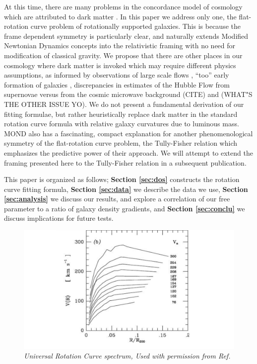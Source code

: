 \documentclass[reprint,%
 amsmath,amssymb,
 aps,
]{revtex4-1}
\begin{document}
   At this time, there are many problems in   the concordance model of   cosmology which are attributed to dark matter \cite{2010dmp..book.....S}.
   In
 this paper we address only  one,   the flat-rotation curve problem of rotationally supported galaxies. This is because  the  frame dependent symmetry   is particularly clear, and   naturally extends Modified Newtonian Dynamics concepts into the  relativistic framing with no need for  modification of classical gravity.
      We propose   that there are other places in our cosmology where dark matter is invoked which   may require different physics assumptions, as informed by observations of large scale flows \cite{Tully:2014gfa},    ``too'' early   formation of galaxies \cite{Naidu_2022}, discrepancies in estimates of the Hubble Flow from supernovae versus from the cosmic microwave background (CITE) and (WHAT"S THE OTHER ISSUE YO). 
      We do not present a fundamental derivation of our fitting formulae, but rather heuristically replace dark matter in the standard rotation curve formula with relative galaxy   curvatures due to luminous mass.  
      MOND  also   has a fascinating, compact explanation for another phenomenological symmetry of the flat-rotation curve problem, the  
   Tully-Fisher relation \cite{1977A&A....54..661T,McGaugh_2000}  which   emphasizes the predictive power of their approach.  We will attempt to extend the  framing presented here to the Tully-Fisher relation in a subsequent publication. 
   
   
      
  
 
 
 
This paper  is organized as follows;
{\bf Section \ref{sec:dos}} constructs  the rotation curve  fitting formula, 
{\bf Section \ref{sec:data}} we describe  the data we use, 
 {\bf Section \ref{sec:analysis}} we  discuss our results, and explore a correlation of our free parameter to a ratio of galaxy density gradients, 
 and  {\bf Section \ref{sec:conclu}} we discuss implications for future tests.   
  
  
 \begin{figure}[h!]
     \centering
     \includegraphics[width=\linewidth]{URC}
     \caption{\emph{Universal Rotation Curve spectrum, Used with permission from Ref.\citep{salucci}}}
     \label{fig:URC}
\end{figure}
  
\end{document}
